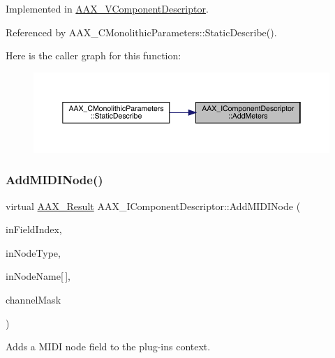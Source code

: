 Implemented in \mbox{\hyperlink{a01901_acf2c5e733819e4261f3a69e71f0c3795}{A\+A\+X\+\_\+\+V\+Component\+Descriptor}}.



Referenced by A\+A\+X\+\_\+\+C\+Monolithic\+Parameters\+::\+Static\+Describe().

Here is the caller graph for this function\+:
\nopagebreak
\begin{figure}[H]
\begin{center}
\leavevmode
\includegraphics[width=350pt]{a01781_a5e4a61afa3d6510891e16d7179bdaa64_icgraph}
\end{center}
\end{figure}
\mbox{\label{a01781_a6284dda9ccca898e33075de29dad4e39}} 
\subsubsection{\texorpdfstring{AddMIDINode()}{AddMIDINode()}}
{\footnotesize\ttfamily virtual \mbox{\hyperlink{a00392_a4d8f69a697df7f70c3a8e9b8ee130d2f}{A\+A\+X\+\_\+\+Result}} A\+A\+X\+\_\+\+I\+Component\+Descriptor\+::\+Add\+M\+I\+D\+I\+Node (\begin{DoxyParamCaption}\item[{\mbox{\hyperlink{a00392_ae807f8986143820cfb5d6da32165c9c7}{A\+A\+X\+\_\+\+C\+Field\+Index}}}]{in\+Field\+Index,  }\item[{\mbox{\hyperlink{a00491_a5e1dffce35d05990dbbad651702678e4}{A\+A\+X\+\_\+\+E\+M\+I\+D\+I\+Node\+Type}}}]{in\+Node\+Type,  }\item[{const char}]{in\+Node\+Name\mbox{[}$\,$\mbox{]},  }\item[{uint32\+\_\+t}]{channel\+Mask }\end{DoxyParamCaption})\hspace{0.3cm}{\ttfamily [pure virtual]}}



Adds a M\+I\+DI node field to the plug-\/in\textquotesingle{}s context. 


